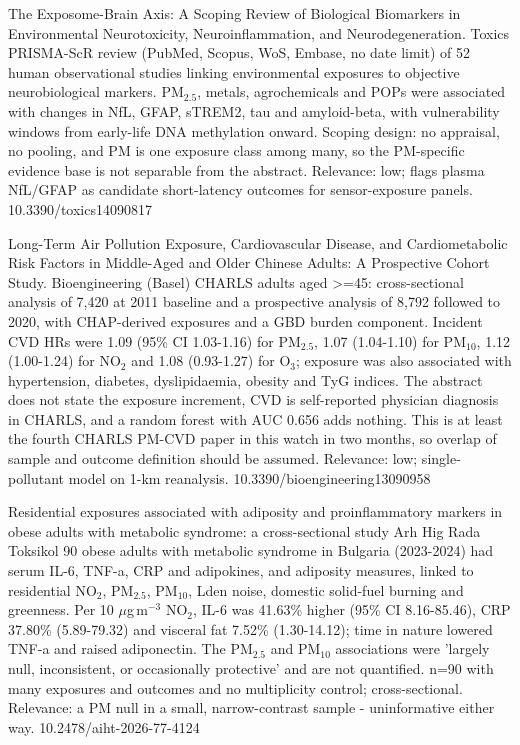 \documentclass[10pt]{article}
\begin{document}
{The Exposome-Brain Axis: A Scoping Review of Biological Biomarkers in Environmental Neurotoxicity, Neuroinflammation, and Neurodegeneration.}
{Toxics}
{PRISMA-ScR review (PubMed, Scopus, WoS, Embase, no date limit) of 52 human observational studies linking environmental exposures to objective neurobiological markers. PM$_{2.5}$, metals, agrochemicals and POPs were associated with changes in NfL, GFAP, sTREM2, tau and amyloid-beta, with vulnerability windows from early-life DNA methylation onward. Scoping design: no appraisal, no pooling, and PM is one exposure class among many, so the PM-specific evidence base is not separable from the abstract. Relevance: low; flags plasma NfL/GFAP as candidate short-latency outcomes for sensor-exposure panels.}
{10.3390/toxics14090817}

\par{}\baselineskip{}\baselineskip
{}

{Long-Term Air Pollution Exposure, Cardiovascular Disease, and Cardiometabolic Risk Factors in Middle-Aged and Older Chinese Adults: A Prospective Cohort Study.}
{Bioengineering (Basel)}
{CHARLS adults aged >=45: cross-sectional analysis of 7,420 at 2011 baseline and a prospective analysis of 8,792 followed to 2020, with CHAP-derived exposures and a GBD burden component. Incident CVD HRs were 1.09 (95\% CI 1.03-1.16) for PM$_{2.5}$, 1.07 (1.04-1.10) for PM$_{10}$, 1.12 (1.00-1.24) for NO$_2$ and 1.08 (0.93-1.27) for O$_3$; exposure was also associated with hypertension, diabetes, dyslipidaemia, obesity and TyG indices. The abstract does not state the exposure increment, CVD is self-reported physician diagnosis in CHARLS, and a random forest with AUC 0.656 adds nothing. This is at least the fourth CHARLS PM-CVD paper in this watch in two months, so overlap of sample and outcome definition should be assumed. Relevance: low; single-pollutant model on 1-km reanalysis.}
{10.3390/bioengineering13090958}

{Residential exposures associated with adiposity and proinflammatory markers in obese adults with metabolic syndrome: a cross-sectional study}
{Arh Hig Rada Toksikol}
{90 obese adults with metabolic syndrome in Bulgaria (2023-2024) had serum IL-6, TNF-a, CRP and adipokines, and adiposity measures, linked to residential NO$_2$, PM$_{2.5}$, PM$_{10}$, Lden noise, domestic solid-fuel burning and greenness. Per 10 $\mu$g\,m$^{-3}$ NO$_2$, IL-6 was 41.63\% higher (95\% CI 8.16-85.46), CRP 37.80\% (5.89-79.32) and visceral fat 7.52\% (1.30-14.12); time in nature lowered TNF-a and raised adiponectin. The PM$_{2.5}$ and PM$_{10}$ associations were 'largely null, inconsistent, or occasionally protective' and are not quantified. n=90 with many exposures and outcomes and no multiplicity control; cross-sectional. Relevance: a PM null in a small, narrow-contrast sample - uninformative either way.}
{10.2478/aiht-2026-77-4124}
\end{document}
